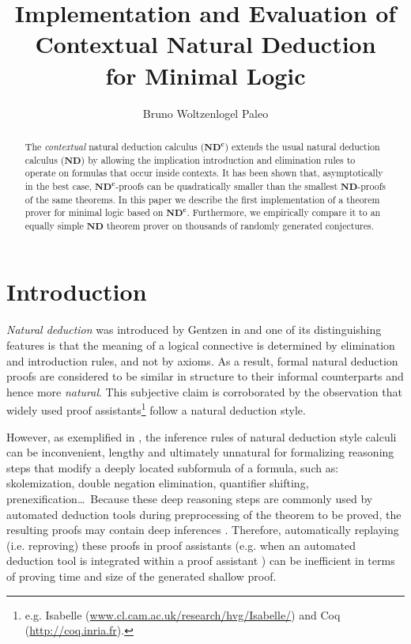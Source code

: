 \documentclass{llncs}
\title{
  Implementation and Evaluation of \\ 
  Contextual Natural Deduction \\
  for Minimal Logic
}
\author{
  Bruno Woltzenlogel Paleo%
}
\institute{
  Theory and Logic Group \\ 
  Vienna University of Technology \\ 
  Vienna, Austria \\
  \email{bruno@logic.at}
}
\begin{document}
\maketitle

\newcommand{\ND}{$\textbf{ND}$\xspace}
\newcommand{\NDd}{$\textbf{ND}^\textbf{c}$\xspace}
\newcommand{\lc}{\lambda^c}

\begin{abstract}
The \emph{contextual} natural deduction calculus ({\NDd}) extends the usual natural deduction calculus ({\ND}) by allowing the implication introduction and elimination rules to operate on formulas that occur inside contexts. It has been shown that, asymptotically in the best case, {\NDd}-proofs can be quadratically smaller than the smallest {\ND}-proofs of the same theorems. In this paper we describe the first implementation of a theorem prover for minimal logic based on {\NDd}. Furthermore, we empirically compare it to an equally simple {\ND} theorem prover on thousands of randomly generated conjectures.
\end{abstract}


\section{Introduction}

\emph{Natural deduction} was introduced by Gentzen in \cite{Gentzen1934Untersuchungen-uber-das-logische-Schliesen} and one of its distinguishing features is that the meaning of a logical connective is determined by elimination and introduction rules, and not by axioms. As a result, formal natural deduction proofs are considered to be similar in structure to their informal counterparts and hence more \emph{natural}. This subjective claim is corroborated by the observation that widely used proof assistants\footnote{e.g. Isabelle {\scriptsize (\url{www.cl.cam.ac.uk/research/hvg/Isabelle/})} and Coq {\scriptsize (\url{http://coq.inria.fr})}.} 
follow a natural deduction style.

However, as exemplified in \cite{NDc}, the inference rules of natural deduction style calculi 
can be inconvenient, lengthy and ultimately unnatural for formalizing reasoning steps that modify a deeply located subformula of a formula, such as: skolemization, double negation elimination, quantifier shifting, prenexification\ldots  \ Because these deep reasoning steps are commonly used by automated deduction tools during preprocessing of the theorem to be proved, the resulting proofs may contain deep inferences \cite{DeharbeFontaineWoltzenlogel-Paleo2011Quantifier-Inference-Rules-in-the-Proof-Format-of-VeriT}. Therefore, automatically replaying (i.e. reproving) these proofs in proof assistants (e.g. when an automated deduction tool is integrated within a proof assistant \cite{BohmeNipkow2010Sledgehammer:-Judgement-Day}) can be inefficient in terms of proving time and size of the generated shallow proof.
\end{document}
